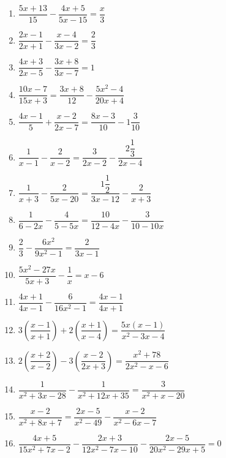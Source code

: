 \documentclass{article}
\begin{document}
\begin{enumerate}[label=\bfseries\small 142.\arabic*, itemsep=4cm]
\item $\dfrac{5x+13}{15} - \dfrac{4x+5}{5x-15} = \dfrac{x}{3}$

\item $\dfrac{2x-1}{2x+1} - \dfrac{x-4}{3x-2} = \dfrac{2}{3}$

\item $\dfrac{4x+3}{2x-5} - \dfrac{3x+8}{3x-7} = 1$

\item $\dfrac{10x-7}{15x+3} = \dfrac{3x+8}{12} - \dfrac{5x^2-4}{20x+4}$

\item $\dfrac{4x-1}{5} + \dfrac{x-2}{2x-7} = \dfrac{8x-3}{10} - 1\dfrac{3}{10}$

\item $\dfrac{1}{x-1} - \dfrac{2}{x-2} = \dfrac{3}{2x-2} - \dfrac{2\dfrac{1}{3}}{2x-4}$

\item $\dfrac{1}{x+3} - \dfrac{2}{5x-20} = \dfrac{1\dfrac{1}{2}}{3x-12} - \dfrac{2}{x+3}$

\item $\dfrac{1}{6-2x} - \dfrac{4}{5-5x} = \dfrac{10}{12-4x} - \dfrac{3}{10-10x}$

\item $\dfrac{2}{3} - \dfrac{6x^2}{9x^2-1} = \dfrac{2}{3x-1}$

\item $\dfrac{5x^2 - 27x}{5x + 3} - \dfrac{1}{x} = x - 6$

\item $\dfrac{4x + 1}{4x - 1} - \dfrac{6}{16x^2 - 1} = \dfrac{4x - 1}{4x + 1}$

\item $3 \left( \dfrac{x - 1}{x + 1} \right) + 2 \left( \dfrac{x + 1}{x - 4} \right) = \dfrac{5x(x - 1)}{x^2 - 3x - 4}$

\item $2 \left( \dfrac{x + 2}{x - 2} \right) - 3 \left( \dfrac{x - 2}{2x + 3} \right) = \dfrac{x^2 + 78}{2x^2 - x - 6}$

\item $\dfrac{1}{x^2 + 3x - 28} - \dfrac{1}{x^2 + 12x + 35} = \dfrac{3}{x^2 + x - 20}$

\item $\dfrac{x - 2}{x^2 + 8x + 7} = \dfrac{2x - 5}{x^2 - 49} - \dfrac{x - 2}{x^2 - 6x - 7}$

\item $\dfrac{4x + 5}{15x^2 + 7x - 2} - \dfrac{2x + 3}{12x^2 - 7x - 10} - \dfrac{2x - 5}{20x^2 - 29x + 5} = 0$


\end{enumerate}
\end{document}
